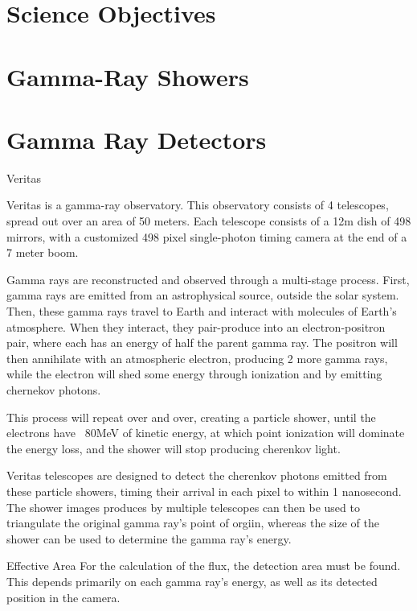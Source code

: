 \section{Science Objectives}

\section{Gamma-Ray Showers}

\section{Gamma Ray Detectors}

Veritas

Veritas is a gamma-ray observatory.
This observatory consists of 4 telescopes, spread out over an area of 50 meters.
Each telescope consists of a 12m dish of 498 mirrors, with a customized 498 pixel single-photon timing camera at the end of a 7 meter boom.

Gamma rays are reconstructed and observed through a multi-stage process.
First, gamma rays are emitted from an astrophysical source, outside the solar system.
Then, these gamma rays travel to Earth and interact with molecules of Earth's atmosphere.
When they interact, they pair-produce into an electron-positron pair, where each has an energy of half the parent gamma ray.
The positron will then annihilate with an atmospheric electron, producing 2 more gamma rays, while the electron will shed some energy through ionization and by emitting chernekov photons.

This process will repeat over and over, creating a particle shower, until the electrons have ~80MeV of kinetic energy, at which point ionization will dominate the energy loss, and the shower will stop producing cherenkov light.

Veritas telescopes are designed to detect the cherenkov photons emitted from these particle showers, timing their arrival in each pixel to within 1 nanosecond.
The shower images produces by multiple telescopes can then be used to triangulate the original gamma ray's point of orgiin, whereas the size of the shower can be used to determine the gamma ray's energy.


Effective Area
For the calculation of the flux, the detection area must be found.
This depends primarily on each gamma ray's energy, as well as its detected position in the camera.

